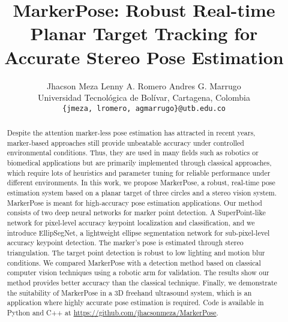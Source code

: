 \documentclass[final]{cvpr}
\begin{document}
\title{MarkerPose: Robust Real-time Planar Target Tracking for Accurate Stereo Pose Estimation}

\author{Jhacson Meza \qquad Lenny A. Romero \qquad Andres G. Marrugo\\
Universidad Tecnológica de Bolívar, Cartagena, Colombia\\
{\tt\small \{jmeza, lromero, agmarrugo\}@utb.edu.co}
}

\maketitle


\begin{abstract}
   Despite the attention marker-less pose estimation has attracted in recent years, marker-based approaches still provide unbeatable accuracy under controlled environmental conditions. Thus, they are used in many fields such as robotics or biomedical applications but are primarily implemented through classical approaches, which require lots of heuristics and parameter tuning for reliable performance under different environments. In this work, we propose MarkerPose, a robust, real-time pose estimation system based on a planar target of three circles and a stereo vision system. MarkerPose is meant for high-accuracy pose estimation applications. Our method consists of two deep neural networks for marker point detection. A SuperPoint-like network for pixel-level accuracy keypoint localization and classification, and we introduce EllipSegNet, a lightweight ellipse segmentation network for sub-pixel-level accuracy keypoint detection. The marker's pose is estimated through stereo triangulation. The target point detection is robust to low lighting and motion blur conditions. We compared MarkerPose with a detection method based on classical computer vision techniques using a robotic arm for validation. The results show our method provides better accuracy than the classical technique. Finally, we demonstrate the suitability of MarkerPose in a 3D freehand ultrasound system, which is an application where highly accurate pose estimation is required. Code is available in Python and C++ at \url{https://github.com/jhacsonmeza/MarkerPose}.
\end{abstract}



\end{document}
